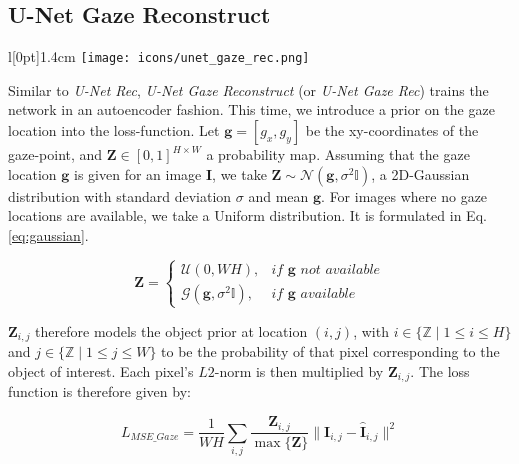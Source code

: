 \clearpage
\subsection{U-Net Gaze Reconstruct} \label{unet_gaze_rec}
\begingroup
\setlength\intextsep{0pt}
\begin{wrapfigure}[4]{l}[0pt]{1.4cm}
\texttt{[image: icons/unet\_gaze\_rec.png]}
\end{wrapfigure}

Similar to \textit{U-Net Rec}, \textit{U-Net Gaze Reconstruct} (or \textit{U-Net Gaze Rec}) trains the network in an autoencoder fashion. This time, we introduce a prior on the gaze location into the loss-function. Let $\boldsymbol{g} = [g_x, g_y]$ be the xy-coordinates of the gaze-point, and  $\boldsymbol{Z} \in [0,1]^{H \times W}$ a probability map. Assuming that the gaze location $\boldsymbol{g}$ is given for an image $\boldsymbol{I}$, we take $\boldsymbol{Z} \sim \mathcal{N}(\boldsymbol{g}, \sigma^2\mathbb{I})$, a 2D-Gaussian distribution with standard deviation $\sigma$ and mean $\boldsymbol{g}$. For images where no gaze locations are available, we take a Uniform distribution. It is formulated in Eq. \ref{eq:gaussian}.

\endgroup

\begin{equation}
\boldsymbol{Z} = 
\begin{cases}
  \mathcal{U}(0,WH),& \textit{if } \boldsymbol{g} \textit{ not available}\\         \mathcal{G}(\boldsymbol{g}, \sigma^2\mathbb{I}),         & \textit{if } \boldsymbol{g} \textit{ available}
\end{cases}
\label{eq:gaussian}
\end{equation}
\hspace{6pt}

$\boldsymbol{Z}_{i,j}$ therefore models the object prior at location $(i,j)$, with $i \in \{\mathbb{Z} \mid 1 \leq i \leq H\}$ and $j \in \{\mathbb{Z} \mid 1 \leq j \leq W\}$ to be the probability of that pixel corresponding to the object of interest. Each pixel's $L2$-norm is then multiplied by $\boldsymbol{Z}_{i,j}$. The loss function is therefore given by:

\begin{equation}
L_{MSE\_Gaze} = \frac{1}{W H} \sum_{i,j} \frac{\boldsymbol{Z}_{i,j}}{\max{\{\boldsymbol{Z}\}}} \|\boldsymbol{I}_{i,j} - \boldsymbol{\hat{I}}_{i,j}\|^2
\label{eq:mse_gaze_loss}
\end{equation}
\hspace{6pt}

